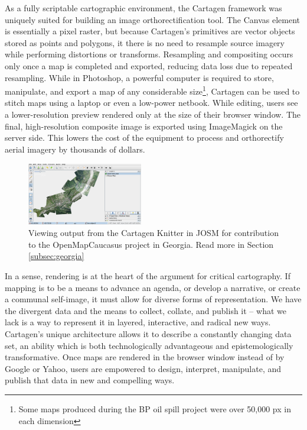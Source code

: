 \documentclass[11pt,oneside,notitlepage]{report}
\begin{document}
As a fully scriptable cartographic environment, the Cartagen framework was uniquely suited for building an image orthorectification tool. The Canvas element is essentially a pixel raster, but because Cartagen's primitives are vector objects stored as points and polygons, it there is no need to resample source imagery while performing distortions or transforms. Resampling and compositing occurs only once a map is completed and exported, reducing data loss due to repeated resampling. While in Photoshop, a powerful computer is required to store, manipulate, and export a map of any considerable size\footnote{Some maps produced during the BP oil spill project were over 50,000 px in each dimension}, Cartagen can be used to stitch maps using a laptop or even a low-power netbook. While editing, users see a lower-resolution preview rendered only at the size of their browser window. The final, high-resolution composite image is exported using ImageMagick on the server side. This lowers the cost of the equipment to process and orthorectify aerial imagery by thousands of dollars. 

\begin{figure}
	\begin{flushright}
		\includegraphics[width=0.45\textwidth]{images/knitter-josm.png}
		\caption{Viewing output from the Cartagen Knitter in \ac{JOSM} for contribution to the OpenMapCaucasus project in Georgia. Read more in Section \ref{subsec:georgia}}
	\end{flushright}
\end{figure}

In a sense, rendering is at the heart of the argument for critical cartography. If mapping is to be a means to advance an agenda, or develop a narrative, or create a communal self-image, it must allow for diverse forms of representation. We have the divergent data and the means to collect, collate, and publish it – what we lack is a way to represent it in layered, interactive, and radical new ways. Cartagen's unique architecture allows it to describe a constantly changing data set, an ability which is both technologically advantageous and epistemologically transformative. Once maps are rendered in the browser window instead of by Google or Yahoo, users are empowered to design, interpret, manipulate, and publish that data in new and compelling ways. 
\end{document}
